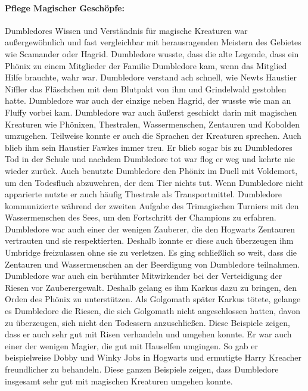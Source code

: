 \documentclass[a4paper, 10pt]{article}
\begin{document}
\paragraph{Pflege Magischer Geschöpfe:}
Dumbledores Wissen und Verständnis für magische Kreaturen war außergewöhnlich und fast vergleichbar mit herausragenden Meistern des Gebietes wie Scamander oder Hagrid. Dumbledore wusste, dass die alte Legende, dass ein Phönix zu einem Mitglieder der Familie Dumbledore kam, wenn das Mitglied Hilfe brauchte, wahr war. Dumbledore verstand ach schnell, wie Newts Haustier Niffler das Fläschchen mit dem Blutpakt von ihm und Grindelwald gestohlen hatte. Dumbledore war auch der einzige neben Hagrid, der wusste wie man an Fluffy vorbei kam. Dumbledore war auch äußerst geschickt darin mit magischen Kreaturen wie Phönixen, Thestralen, Wassermenschen, Zentauren und Kobolden umzugehen. Teilweise konnte er auch die Sprachen der Kreaturen sprechen. Auch blieb ihm sein Haustier Fawkes immer treu. Er blieb sogar bis zu Dumbledores Tod in der Schule und nachdem Dumbledore tot war flog er weg und kehrte nie wieder zurück. Auch benutzte Dumbledore den Phönix im Duell mit Voldemort, um den Todesfluch abzuwehren, der dem Tier nichts tut. Wenn Dumbledore nicht apparierte nutzte er auch häufig Thestrale als Transportmittel. Dumbledore kommunizierte während der zweiten Aufgabe des Trimagischen Turniers mit den Wassermenschen des Sees, um den Fortschritt der Champions zu erfahren. Dumbledore war auch einer der wenigen Zauberer, die den Hogwarts Zentauren vertrauten und sie respektierten. Deshalb konnte er diese auch überzeugen ihm Umbridge freizulassen ohne sie zu verletzen. Es ging schließlich so weit, dass die Zentauren und Wassermenschen an der Beerdigung von Dumbledore teilnahmen. Dumbledore war auch ein berühmter Mitwirkender bei der Verteidigung der Riesen vor Zauberergewalt. Deshalb gelang es ihm Karkus dazu zu bringen, den Orden des Phönix zu unterstützen. Als Golgomath später Karkus tötete, gelange es Dumbledore die Riesen, die sich Golgomath nicht angeschlossen hatten, davon zu überzeugen, sich nicht den Todessern anzuschließen. Diese Beispiele zeigen, dass er auch sehr gut mit Risen verhandeln und umgehen konnte. Er war auch einer der wenigen Magier, die gut mit Hauselfen umgingen. So gab er beispielweise
Dobby und Winky Jobs in Hogwarts und ermutigte Harry Kreacher freundlicher zu behandeln. Diese ganzen Beispiele zeigen, dass Dumbledore insgesamt sehr gut mit magischen Kreaturen umgehen konnte.
\end{document}
